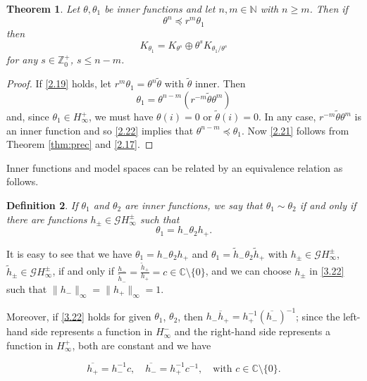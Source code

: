 \documentclass[11pt]{article}
\def\NN{\mathbb{N}}
\newtheorem{thm}{Theorem}[section]
\newtheorem{defn}[thm]{Definition}
\numberwithin{equation}{section}
\def\beginpf{\begin{proof}}
\def\endpf{\end{proof}}
\def\beq{\begin{equation}}
\def\eeq{\end{equation}}
\begin{document}
\begin{thm} Let $\theta, \theta_1$ be inner functions and let $n,m \in \NN$ with $n \geq m$. Then if
\beq \label{2.19}
\theta^n  \preceq r^m\theta_1
\eeq
then
\beq \label{2.21}
K_{\theta_1} = K_{\theta^s} \oplus \theta^s K_{\theta_1/\theta^s}
\eeq
for any $s \in \mathbb{Z}_0^+$, $s \leq n-m$.
\end{thm}

\beginpf
If \eqref{2.19} holds, let $r^m\theta_1=\theta^n\widetilde\theta$ with $\widetilde\theta$ inner. Then
\beq \label{2.22}
\theta_1 = \theta^{n-m}(r^{-m}\widetilde\theta\theta^m)
\eeq
and, since $\theta_1 \in H_\infty^+$, we must have $\theta(i)=0$ or $\widetilde\theta(i)=0$. In any case, $r^{-m}\widetilde\theta\theta^m$ is an inner function and so \eqref{2.22} implies that $\theta^{n-m}  \preceq \theta_1$. Now \eqref{2.21} follows from Theorem \ref{thm:prec} and \eqref{2.17}.
\endpf

Inner functions and model spaces can be related by an equivalence relation as follows.

\begin{defn}
If $\theta_1$ and $\theta_2$ are inner functions, we say that $\theta_1 \sim\theta_2$ if and only if there are functions $h_{\pm} \in \mathcal{G}H_\infty^{\pm}$ such that
\begin{equation}\label{3.22}
\theta_1=h_-\theta_2h_+.
\end{equation}
\end{defn}

It is easy to see that we have $\theta_1=h_-\theta_2h_+$ and $\theta_1=\tilde{h}_-\theta_2\tilde{h}_+$ with $h_{\pm} \in \mathcal{G}H_\infty^{\pm}$, $\tilde{h}_{\pm} \in \mathcal{G}H_\infty^{\pm}$, if and only if $\frac{h_-}{\tilde{h}_-}=\frac{\tilde{h}_+}{h_+}=c \in \mathbb{C}\setminus \{0\}$, and we can choose $h_{\pm}$ in \eqref{3.22} such that $\|h_-\|_\infty=\|h_+\|_\infty=1$.

Moreover, if \eqref{3.22} holds for given $\theta_1$, $\theta_2$, then $h_-\overline {h}_+=h_+^{-1}{(\overline {h_-})^{-1}}$; since the left-hand side represents a function in $H_\infty^-$ and the right-hand side represents a function in  $H_\infty^+$, both are constant and we have

\begin{equation}\label{3.24}
\overline {h_+}=h_-^{-1}c,  \quad \overline{h_-}=h_+^{-1}c^{-1}, \quad \text{with } c \in \mathbb{C}\setminus \{0\}.
\end{equation}
\end{document}
